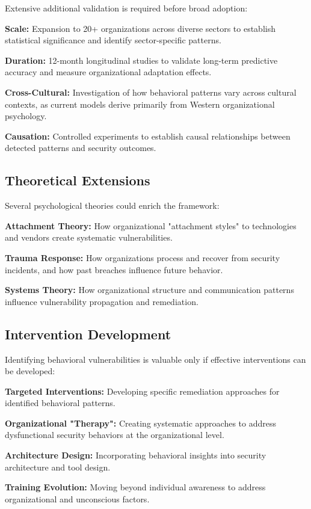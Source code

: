 \documentclass[10pt, twocolumn]{article}
\begin{document}
Extensive additional validation is required before broad adoption:

\textbf{Scale:} Expansion to 20+ organizations across diverse sectors to establish statistical significance and identify sector-specific patterns.

\textbf{Duration:} 12-month longitudinal studies to validate long-term predictive accuracy and measure organizational adaptation effects.

\textbf{Cross-Cultural:} Investigation of how behavioral patterns vary across cultural contexts, as current models derive primarily from Western organizational psychology.

\textbf{Causation:} Controlled experiments to establish causal relationships between detected patterns and security outcomes.

\subsection{Theoretical Extensions}

Several psychological theories could enrich the framework:

\textbf{Attachment Theory:} How organizational "attachment styles" to technologies and vendors create systematic vulnerabilities.

\textbf{Trauma Response:} How organizations process and recover from security incidents, and how past breaches influence future behavior.

\textbf{Systems Theory:} How organizational structure and communication patterns influence vulnerability propagation and remediation.

\subsection{Intervention Development}

Identifying behavioral vulnerabilities is valuable only if effective interventions can be developed:

\textbf{Targeted Interventions:} Developing specific remediation approaches for identified behavioral patterns.

\textbf{Organizational "Therapy":} Creating systematic approaches to address dysfunctional security behaviors at the organizational level.

\textbf{Architecture Design:} Incorporating behavioral insights into security architecture and tool design.

\textbf{Training Evolution:} Moving beyond individual awareness to address organizational and unconscious factors.
\end{document}
